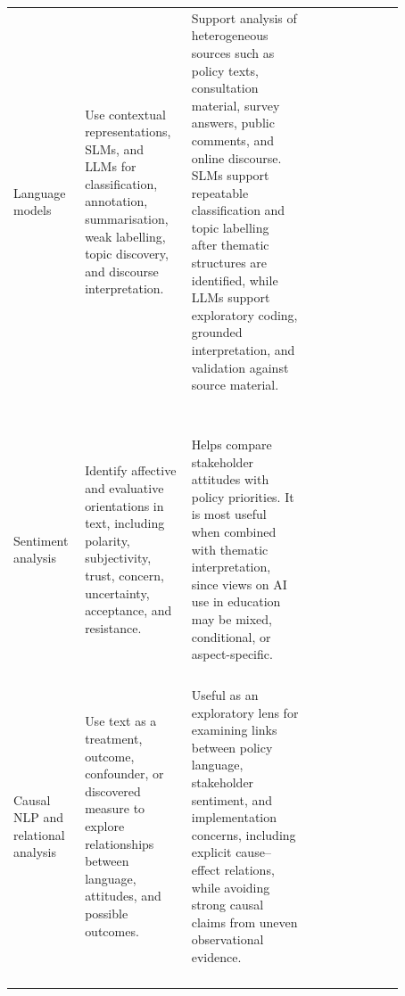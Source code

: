 \begin{table}[p]
\begin{tabular}{
>{\raggedright\arraybackslash}p{0.12\linewidth}
>{\raggedright\arraybackslash}p{0.24\linewidth}
>{\raggedright\arraybackslash}p{0.29\linewidth}
>{\raggedright\arraybackslash}p{0.22\linewidth} }
Language models & Use contextual representations, SLMs, and LLMs for classification,
annotation, summarisation, weak labelling, topic discovery, and discourse
interpretation. & Support analysis of heterogeneous sources such as policy
texts, consultation material, survey answers, public comments, and online discourse.
SLMs support repeatable classification and topic labelling after thematic structures
are identified, while LLMs support exploratory coding, grounded
interpretation, and validation against source material. &
\vspace*{-.2cm}
\shortstack[l]{
\cite{devlin2019bert}\\
\cite{liu2019roberta}\\
\cite{lu2024small}\\
\cite{nguyen2025survey}\\
\cite{mekaoui2026semanticlabels}\\
\cite{tornberg2024bestpractices}\\
\cite{tornberg2025llm}\\
\cite{ziems2024llms}\\
\cite{es2024ragas}
} \\

Sentiment analysis & Identify affective and evaluative orientations in text,
including polarity, subjectivity, trust, concern, uncertainty, acceptance, and
resistance. & Helps compare stakeholder attitudes with policy priorities. It is most
useful when combined with thematic interpretation, since views on AI use in education
may be mixed, conditional, or aspect-specific. &
\vspace*{-.2cm}\shortstack[l]{
\cite{pang2008opinion}\\
\cite{liu2012sentiment}\\
\cite{hutto2014vader}\\
\cite{tan2023survey}\\
\cite{mao2024sentiment}
} \\

Causal NLP and relational analysis & Use text as a treatment, outcome, confounder, or
discovered measure to explore relationships between language, attitudes, and possible
outcomes. & Useful as an exploratory lens for examining links between policy
language, stakeholder sentiment, and implementation concerns, including explicit
cause--effect relations, while avoiding strong causal claims from uneven
observational evidence. & 
\vspace*{-.2cm} 
\shortstack[l]{
\cite{rubin1974estimating}\\
\cite{pearl2009causality}\\
\cite{egami2022causal}\\
\cite{ma2025causal}\\
\cite{wan2025large}
} \\


\end{tabular}
\end{table}
